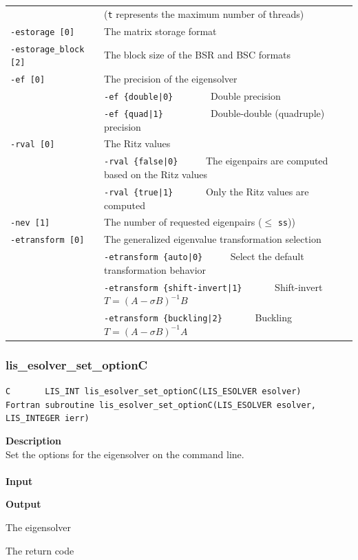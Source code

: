 \documentclass[a4paper]{article}
\newcommand{\namelistlabel}[1]{\mbox{#1}\hfill}
\newenvironment{namelist}[1]{%
\begin{list}{}
  {\let\makelabel\namelistlabel
  \settowidth{\labelwidth}{#1}
  \setlength{\leftmargin}{1.1\labelwidth}}
  }{%
\end{list}}
\begin{document}
\begin{minipage}[t]{\textwidth}
\begin{center}
\begin{tabular}{l|ll}
                            & (\verb=t= represents the maximum number of
 threads) \\
\verb=-estorage [0]=   & The matrix storage format \\
\verb=-estorage_block [2]=& The block size of the BSR and BSC formats\\ 
\verb=-ef [0]=         & The precision of the eigensolver\\
                       & \verb=-ef {double|0}       =  Double precision \\ 
                       & \verb=-ef {quad|1}         =  Double-double (quadruple) precision \\
\verb=-rval [0]=       & The Ritz values \\
                       & \verb=-rval {false|0}     =  The eigenpairs are computed based on the Ritz values \\
                       & \verb=-rval {true|1}      =  Only the Ritz values are computed \\
\verb=-nev [1]=        & The number of requested eigenpairs ($\le$ \verb=ss=)) \\
\verb=-etransform [0]=       & The generalized eigenvalue transformation selection \\
                       & \verb=-etransform {auto|0}     =  Select the default transformation behavior \\
                       & \verb=-etransform {shift-invert|1}      =  Shift-invert $T = (A - \sigma B)^{-1}B$ \\
                       & \verb=-etransform {buckling|2}      =  Buckling $T = (A - \sigma B)^{-1}A$ \\
\hline         
\end{tabular}
\end{center}
\end{minipage}

\newpage
\subsubsection{lis\_esolver\_set\_optionC}
\begin{screen}
\verb|C       LIS_INT lis_esolver_set_optionC(LIS_ESOLVER esolver)|\\
\verb|Fortran subroutine lis_esolver_set_optionC(LIS_ESOLVER esolver, LIS_INTEGER ierr)|
\end{screen}
{\bf Description}\\
\indent
Set the options for the eigensolver on the command line.
\\ \\
\noindent
{\bf Input}
\begin{namelist}{XXXXXXXXXXXXXXXXXXXX}
\item[None]
\end{namelist}
{\bf Output}
\begin{namelist}{XXXXXXXXXXXXXXXXXXXX}
\item[\tt esolver] The eigensolver
\item[\tt ierr] The return code
\end{namelist}
\end{document}
